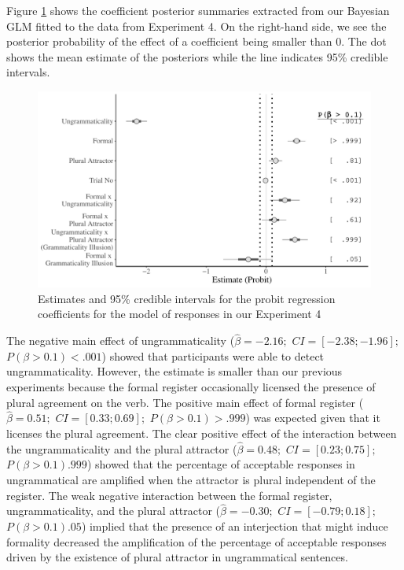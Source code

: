 Figure \ref{fig:exp4Bayes} shows the coefficient posterior summaries extracted from our Bayesian GLM fitted to the data from Experiment 4. On the right-hand side, we see the posterior probability of the effect of a coefficient being smaller than 0. The dot shows the mean estimate of the posteriors while the line indicates 95\% credible intervals.

\begin{knitrout}
\color{fgcolor}\begin{figure}[hbt!]

{\centering \includegraphics[width=\linewidth]{figure/exp4Bayes-1} 

}

\caption{Estimates and 95\% credible intervals for the probit regression coefficients for the model of responses in our Experiment 4}\label{fig:exp4Bayes}
\end{figure}

\end{knitrout}

The negative main effect of ungrammaticality ($\hat{\beta}=-2.16;$ $CI=[-2.38; -1.96];$ $P(\beta>0.1)< .001$) showed that participants were able to detect ungrammaticality. However, the estimate is smaller than our previous experiments because the formal register occasionally licensed the presence of plural agreement on the verb. The positive main effect of formal register ($\hat{\beta}=0.51;$ $CI=[0.33; 0.69];$ $P(\beta>0.1)> .999$) was expected given that it licenses the plural agreement. The clear positive effect of the interaction between the ungrammaticality and the plural attractor ($\hat{\beta}=0.48;$ $CI=[0.23; 0.75];$ $P(\beta>0.1)  .999$) showed that the percentage of acceptable responses in ungrammatical are amplified when the attractor is plural independent of the register. The weak negative interaction between the formal register, ungrammaticality, and the plural attractor ($\hat{\beta}=-0.30;$ $CI=[-0.79; 0.18];$ $P(\beta>0.1)   .05$) implied that the presence of an interjection that might induce formality decreased the amplification of the percentage of acceptable responses driven by the existence of plural attractor in ungrammatical sentences. 


